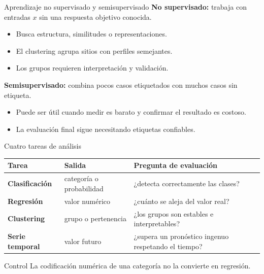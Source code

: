 \documentclass[aspectratio=169,10pt]{beamer}
\begin{document}
\begin{frame}{Aprendizaje no supervisado y semisupervisado}
  \small
  \textbf{No supervisado:} trabaja con entradas $x$ sin una respuesta objetivo conocida.
  \begin{itemize}
    \item Busca estructura, similitudes o representaciones.
    \item El clustering agrupa sitios con perfiles semejantes.
    \item Los grupos requieren interpretación y validación.
  \end{itemize}
  \textbf{Semisupervisado:} combina pocos casos etiquetados con muchos casos sin etiqueta.
  \begin{itemize}
    \item Puede ser útil cuando medir es barato y confirmar el resultado es costoso.
    \item La evaluación final sigue necesitando etiquetas confiables.
  \end{itemize}
\end{frame}

\begin{frame}{Cuatro tareas de análisis}
  \footnotesize
  \begin{tabularx}{\textwidth}{>{\bfseries}p{} p{} X}
    \toprule Tarea & Salida & Pregunta de evaluación \\ \midrule
    Clasificación & categoría o probabilidad & ¿detecta correctamente las clases? \\
    Regresión & valor numérico & ¿cuánto se aleja del valor real? \\
    Clustering & grupo o pertenencia & ¿los grupos son estables e interpretables? \\
    Serie temporal & valor futuro & ¿supera un pronóstico ingenuo respetando el tiempo? \\
    \bottomrule
  \end{tabularx}
  \begin{alertblock}{Control}
    La codificación numérica de una categoría no la convierte en regresión.
  \end{alertblock}
\end{frame}
\end{document}
